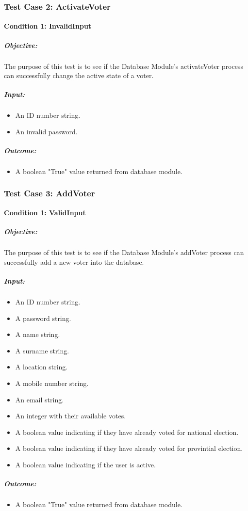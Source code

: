 \documentclass[11pt]{article}
\begin{document}
	\subsubsection{Test Case 2: ActivateVoter}
	\paragraph{Condition 1: InvalidInput}	
	\subparagraph{Objective:}
	The purpose of this test is to see if the Database Module's activateVoter process can successfully change the active state of a voter.
	\subparagraph{Input:}
	\begin{itemize}
		\item An ID number string.
		\item An invalid password.
	\end{itemize}
	\subparagraph{Outcome:}
	\begin{itemize}
		\item A boolean "True" value returned from database module.
	\end{itemize}
	
	\subsubsection{Test Case 3: AddVoter}
	\paragraph{Condition 1: ValidInput}	
	\subparagraph{Objective:}
	The purpose of this test is to see if the Database Module's addVoter process can successfully add a new voter into the database.
	\subparagraph{Input:}
	\begin{itemize}
		\item An ID number string.
		\item A password string.
		\item A name string.
		\item A surname string.
		\item A location string.
		\item A mobile number string.
		\item An email string.
		\item An integer with their available votes.
		\item A boolean value indicating if they have already voted for national election.
		\item A boolean value indicating if they have already voted for provintial election.
		\item A boolean value indicating if the user is active.
	\end{itemize}
	\subparagraph{Outcome:}
	\begin{itemize}
		\item A boolean "True" value returned from database module.
	\end{itemize}
	
\end{document}
